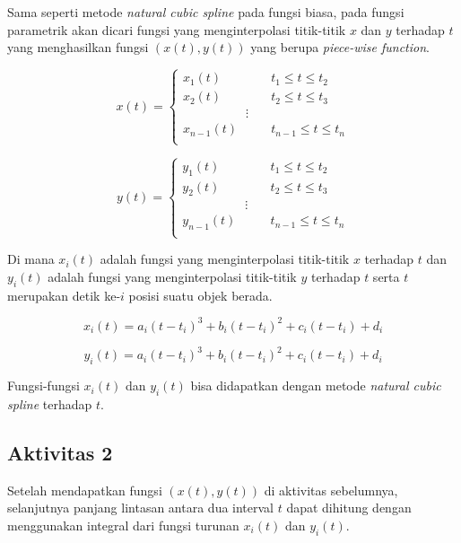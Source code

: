 \documentclass[11pt]{article}
\begin{document}
\medskip

Sama seperti metode \textit{natural cubic spline} pada fungsi biasa, pada fungsi parametrik akan dicari fungsi yang menginterpolasi titik-titik $x$ dan $y$ terhadap $t$ yang menghasilkan fungsi $(x(t),y(t))$ yang berupa \textit{piece-wise function}.

\begin{multicols}{2}
\[
    x(t) = \left\{
        \begin{array}{ll}
            x_1(t) & \quad t_1 \leq t \leq t_2 \\
            x_2(t) & \quad t_2 \leq t \leq t_3 \\
            \quad \quad \quad \quad \quad \vdots \\
            x_{n-1}(t) & \quad t_{n-1} \leq t \leq t_n \\
        \end{array}
    \right.
\]

\[
    y(t) = \left\{
        \begin{array}{ll}
            y_1(t) & \quad t_1 \leq t \leq t_2 \\
            y_2(t) & \quad t_2 \leq t \leq t_3 \\
            \quad \quad \quad \quad \quad \vdots \\
            y_{n-1}(t) & \quad t_{n-1} \leq t \leq t_n \\
        \end{array}
    \right.
\]
\end{multicols}

Di mana $x_i(t)$ adalah fungsi yang menginterpolasi titik-titik $x$ terhadap $t$ dan $y_i(t)$ adalah fungsi yang menginterpolasi titik-titik $y$ terhadap $t$ serta $t$ merupakan detik ke-$i$ posisi suatu objek berada.

\[
    x_i(t) = a_i(t-t_i)^3 + b_i(t-t_i)^2 + c_i(t-t_i) + d_i
\]

\[
    y_i(t) = a_i(t-t_i)^3 + b_i(t-t_i)^2 + c_i(t-t_i) + d_i
\]

Fungsi-fungsi $x_i(t)$ dan $y_i(t)$ bisa didapatkan dengan metode \textit{natural cubic spline} terhadap $t$.


\subsection{Aktivitas 2}

Setelah mendapatkan fungsi $(x(t),y(t))$ di aktivitas sebelumnya, selanjutnya panjang lintasan antara dua interval $t$ dapat dihitung dengan menggunakan integral dari fungsi turunan $x_i(t)$ dan $y_i(t)$.
\end{document}

